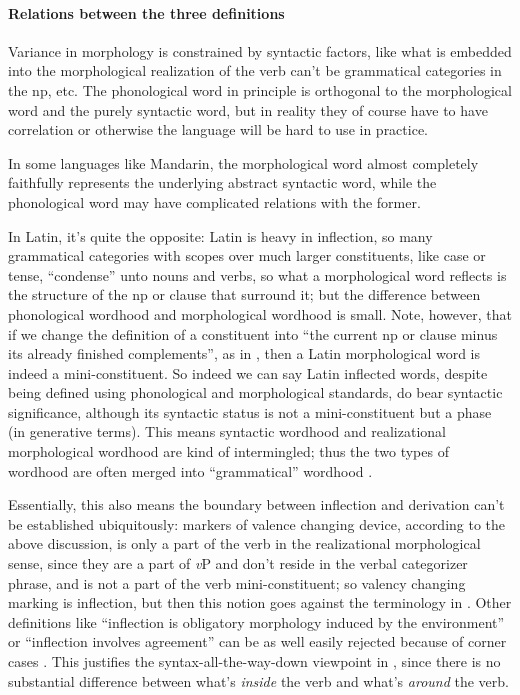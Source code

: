 \documentclass[a4paper, oneside, 12pt]{report}
\newcommand*{\citesec}[1]{\S~{#1}}
\newcommand{\vP}{\textit{v}P}
\begin{document}
{\paragraph{Relations between the three definitions} 
Variance in morphology is constrained by syntactic factors,
like what is embedded into the morphological realization of the verb 
can't be grammatical categories in the \acs{np}, etc.
The phonological word in principle is orthogonal to 
the morphological word and the purely syntactic word,
but in reality they of course have to have correlation
or otherwise the language will be hard to use in practice.

In some languages like Mandarin, 
the morphological word almost completely faithfully represents 
the underlying abstract syntactic word, 
while the phonological word may have complicated relations with the former.

In Latin, it's quite the opposite: 
Latin is heavy in inflection, 
so many grammatical categories with scopes over much larger constituents, 
like case or tense, 
``condense'' unto nouns and verbs, 
so what a morphological word reflects 
is the structure of the \acs{np} or clause that surround it;
but the difference between phonological wordhood 
and morphological wordhood is small. 
Note, however, that if we change the definition of a constituent 
into ``the current \acs{np} or clause minus its already finished complements'',
as in ,
then a Latin morphological word is indeed a mini-constituent.
So indeed we can say Latin inflected words,
despite being defined using phonological and morphological standards,
do bear syntactic significance,
although its syntactic status 
is not a mini-constituent but a phase (in generative terms).
This means syntactic wordhood and realizational morphological wordhood
are kind of intermingled;
thus the two types of wordhood are often 
merged into ``grammatical'' wordhood \citet[\citesec{10.4}]{dixon2010basic2}. 

Essentially, this also means the boundary between inflection and derivation 
can't be established ubiquitously:
markers of valence changing device, 
according to the above discussion,
is only a part of the verb in the realizational morphological sense, 
since they are a part of \vP{} and 
don't reside in the verbal categorizer phrase, 
and is not a part of the verb mini-constituent;
so valency changing marking is inflection,
but then this notion goes against the terminology in \citet{jacques2021grammar}.
Other definitions like ``inflection is obligatory morphology induced by the environment''
or ``inflection involves agreement''
can be as well easily rejected because of corner cases 
\citep[\citesec{5.3}]{dixon2009basic1}. 
This justifies the syntax-all-the-way-down viewpoint in 
,
since there is no substantial difference 
between what's \emph{inside} the verb and what's \emph{around} the verb.

}
\end{document}
